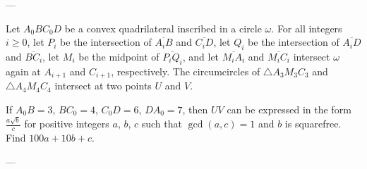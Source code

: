 
---

Let $A_0BC_0D$ be a convex quadrilateral inscribed in a circle $\omega$. For all integers $i\ge0$, let $P_i$ be the intersection of $\overline{A_iB}$ and $\overline{C_iD}$, let $Q_i$ be the intersection of $\overline{A_iD}$ and $\overline{BC_i}$, let $M_i$ be the midpoint of $\overline{P_iQ_i}$, and let $\overline{M_iA_i}$ and $\overline{M_iC_i}$ intersect $\omega$ again at $A_{i+1}$ and $C_{i+1}$, respectively. The circumcircles of $\triangle A_3M_3C_3$ and $\triangle A_4M_4C_4$ intersect at two points $U$ and $V$.

If $A_0B=3$, $BC_0=4$, $C_0D=6$, $DA_0=7$, then $UV$ can be expressed in the form $\tfrac{a\sqrt b}c$ for positive integers $a$, $b$, $c$ such that $\gcd(a,c)=1$ and $b$ is squarefree. Find $100a+10b+c$.

---

